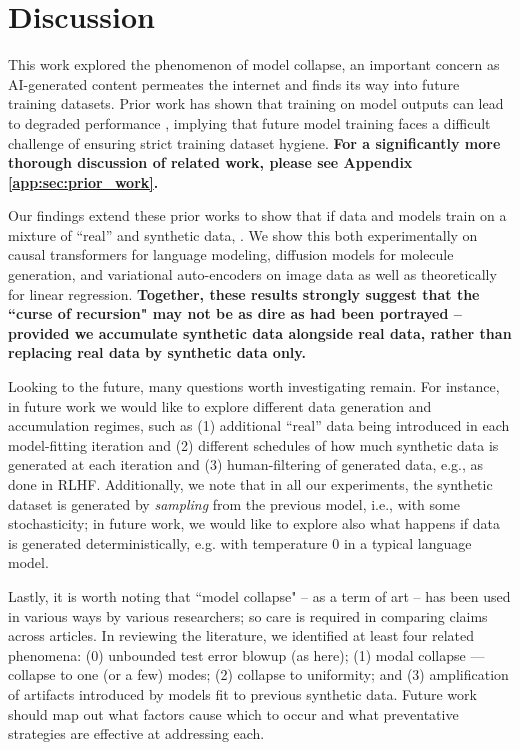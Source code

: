 \section{Discussion}
\label{sec:discussion}

This work explored the phenomenon of model collapse, an important concern as AI-generated content permeates the internet and finds its way into future training datasets. Prior work has shown that training on model outputs can lead to degraded performance \citep{martinez2023combining,martinez2023towards,shumailov2023curse,alemohammad2023self,hataya2023will,bertrand2023stability,briesch2023large,dohmatob2024model,dohmatob2024tale}, implying that future model training faces a difficult challenge of ensuring strict training dataset hygiene.
\textbf{For a significantly more thorough discussion of related work, please see Appendix \ref{app:sec:prior_work}.}


Our findings extend these prior works to show that if data  and models train on a mixture of ``real'' and synthetic data, . We show this both experimentally on causal transformers for language modeling, diffusion models for molecule generation, and variational auto-encoders on image data as well as theoretically for linear regression. \textbf{Together, these results strongly suggest that the ``curse of recursion" may not be as dire as had been portrayed \--- provided we accumulate synthetic data alongside real data, rather than replacing real data by synthetic data only.}

Looking to the future, many questions worth investigating remain. For instance, in future work we would like to explore different data generation and accumulation regimes, such as (1) additional ``real'' data being introduced in each model-fitting iteration and (2) different schedules of how much synthetic data is generated at each iteration and (3) human-filtering of generated data, e.g., as done in RLHF. Additionally, we note that in all our experiments, the synthetic dataset is generated by \textit{sampling} from the previous model, i.e., with some stochasticity; in future work, we would like to explore also what happens if data is generated deterministically, e.g. with temperature 0 in a typical language model.

Lastly, it is worth noting that ``model collapse" -- as a term of art -- has been used in various ways by various researchers; so care is required in comparing claims across articles. In reviewing the literature, we identified at least four related phenomena: (0) unbounded test error blowup (as here); (1) modal collapse --- collapse to one (or a few) modes; (2) collapse to uniformity; and (3) amplification of artifacts introduced by models fit to previous synthetic data. Future work should map out what factors cause which to occur and what preventative strategies are effective at addressing each.

